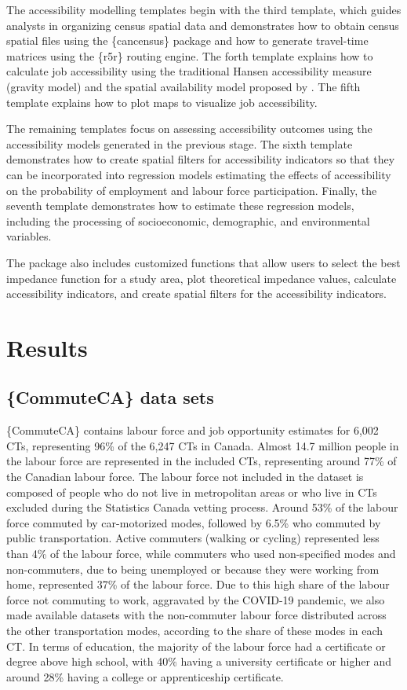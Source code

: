 \documentclass[sn-basic,lineno,pdflatex]{sn-jnl}
\begin{document}
The accessibility modelling templates begin with the third template,
which guides analysts in organizing census spatial data and demonstrates
how to obtain census spatial files using the \{cancensus\} package and
how to generate travel-time matrices using the \{r5r\} routing engine.
The forth template explains how to calculate job accessibility using the
traditional Hansen accessibility measure (gravity model) and the spatial
availability model proposed by \citet{soukhov2023a}. The fifth template
explains how to plot maps to visualize job accessibility.

The remaining templates focus on assessing accessibility outcomes using
the accessibility models generated in the previous stage. The sixth
template demonstrates how to create spatial filters for accessibility
indicators so that they can be incorporated into regression models
estimating the effects of accessibility on the probability of employment
and labour force participation. Finally, the seventh template
demonstrates how to estimate these regression models, including the
processing of socioeconomic, demographic, and environmental variables.

The package also includes customized functions that allow users to
select the best impedance function for a study area, plot theoretical
impedance values, calculate accessibility indicators, and create spatial
filters for the accessibility indicators.

\section{Results}\label{results}

\subsection{\{CommuteCA\} data sets}\label{commuteca-data-sets}

\{CommuteCA\} contains labour force and job opportunity estimates for
6,002 CTs, representing 96\% of the 6,247 CTs in Canada. Almost 14.7
million people in the labour force are represented in the included CTs,
representing around 77\% of the Canadian labour force. The labour force
not included in the dataset is composed of people who do not live in
metropolitan areas or who live in CTs excluded during the Statistics
Canada vetting process. Around 53\% of the labour force commuted by
car-motorized modes, followed by 6.5\% who commuted by public
transportation. Active commuters (walking or cycling) represented less
than 4\% of the labour force, while commuters who used non-specified
modes and non-commuters, due to being unemployed or because they were
working from home, represented 37\% of the labour force. Due to this
high share of the labour force not commuting to work, aggravated by the
COVID-19 pandemic, we also made available datasets with the non-commuter
labour force distributed across the other transportation modes,
according to the share of these modes in each CT. In terms of education,
the majority of the labour force had a certificate or degree above high
school, with 40\% having a university certificate or higher and around
28\% having a college or apprenticeship certificate.
\end{document}
